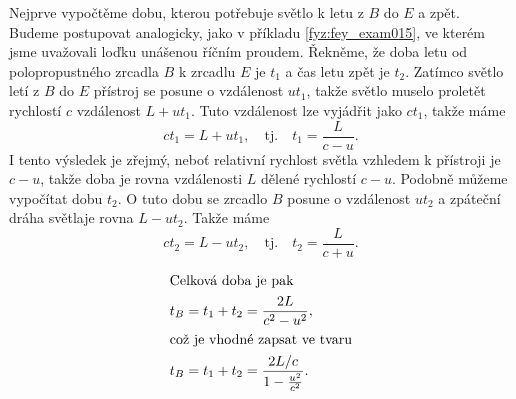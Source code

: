     Nejprve vypočtěme dobu, kterou potřebuje světlo k letu z \(B\) do \(E\) a zpět. Budeme
    postupovat analogicky, jako v příkladu \ref{fyz:fey_exam015}, ve kterém jsme uvažovali loďku
    unášenou říčním proudem. Řekněme, že doba letu od polopropustného zrcadla \(B\) k zrcadlu \(E\)
    je \(t_1\) a čas letu zpět je \(t_2\). Zatímco světlo letí z \(B\) do \(E\) přístroj se posune o
    vzdálenost \(ut_1\), takže světlo muselo proletět rychlostí \(c\) vzdálenost \(L + ut_1\). Tuto
    vzdálenost lze vyjádřit jako \(ct_1\), takže máme    
    \begin{equation*}
      ct_1 = L + ut_1, \quad\text{tj.}\quad t_1 = \frac{L}{c - u}.
    \end{equation*}
    I tento výsledek je zřejmý, neboť relativní rychlost světla vzhledem k přístroji je \(c - u\), 
    takže doba je rovna vzdálenosti \(L\) dělené rychlostí \(c- u\). Podobně můžeme vypočítat dobu 
    \(t_2\). O tuto dobu se zrcadlo \(B\) posune o vzdálenost \(ut_2\) a zpáteční dráha světlaje 
    rovna \(L- ut_2\). Takže máme
    \begin{equation*}
      ct_2 = L - ut_2, \quad\text{tj.}\quad t_2 = \frac{L}{c + u}.
    \end{equation*}
    
    
    \begin{align}
      \shortintertext{Celková doba je pak}
        t_B = t_1 + t_2 &= \frac{2L}{c^2 - u^2},                            \nonumber\\
      \shortintertext{což je vhodné zapsat ve tvaru}
        t_B = t_1 + t_2 &= \frac{2L/c}{1- \frac{u^2}{c^2}}.          \label{fyz:eq186}
    \end{align}
    
